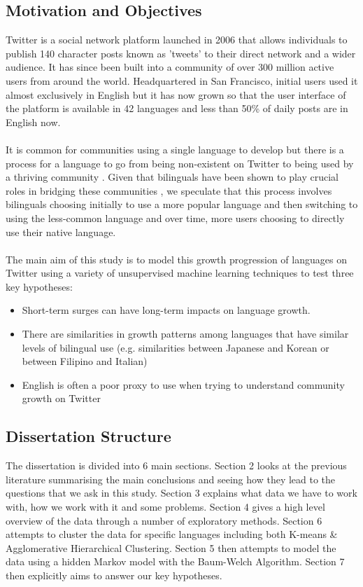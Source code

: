 \documentclass[12pt]{article}
\begin{document}
\subsection{Motivation and Objectives}
Twitter is a social network platform launched in 2006 that allows individuals to publish 140 character posts known as 'tweets' to their direct network and a wider audience. It has since been built into a community of over 300 million active users from around the world. Headquartered in San Francisco, initial users used it almost exclusively in English but it has now grown so that the user interface of the platform is available in 42 languages and less than 50\% \cite{Halemain} of daily posts are in English now. 
\\\\
It is common for communities using a single language to develop \cite{Halemain} but there is a process for a language to go from being non-existent on Twitter to being used by a thriving community . Given that bilinguals have been shown to play crucial roles in bridging these communities \cite{Halemain}, we speculate that this process involves bilinguals choosing initially to use a more popular language and then switching to using the less-common language and over time, more  users choosing to directly use their native language. 
\\\\
The main aim of this study is to model this growth progression of languages on Twitter using a variety of unsupervised machine learning techniques to test three key hypotheses:
\begin{itemize}
\item Short-term surges can have long-term impacts on language growth.
\item There are similarities in growth patterns among languages that have similar levels of bilingual use (e.g. similarities between Japanese and Korean or between Filipino and Italian)
\item English is often a poor proxy to use when trying to understand community growth on Twitter 
\end{itemize}
\subsection{Dissertation Structure}
The dissertation is divided into 6 main sections. Section 2 looks at the previous literature summarising the main conclusions and seeing how they lead to the questions that we ask in this study. Section 3 explains what data we have to work with, how we work with it and some problems. Section 4 gives a high level overview of the data through a number of exploratory methods. Section 6 attempts to cluster the data for specific languages including both K-means \& Agglomerative Hierarchical Clustering. Section 5 then attempts to model the data using a hidden Markov model with the Baum-Welch Algorithm. Section 7 then explicitly aims to answer our key hypotheses.
\newpage
\end{document}
